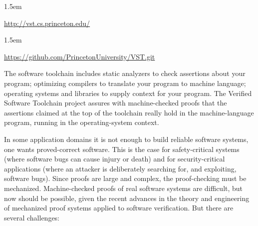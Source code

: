 \documentclass[12pt,twoside]{article}
\begin{document}
\begin{mddefinitions}%


\begin{mdbmarginx}{}{}{}{1.5em}%
\begin{mddefdata}%
\href{http://vst.cs.princeton.edu/}{{\ttfamily http://\hspace{0pt}vst.\hspace{0pt}cs.\hspace{0pt}princeton.\hspace{0pt}edu/\hspace{0pt}}}
\end{mddefdata}%
\end{mdbmarginx}%


\begin{mdbmarginx}{}{}{}{1.5em}%
\begin{mddefdata}%
\href{https://github.com/PrincetonUniversity/VST.git}{{\ttfamily https://\hspace{0pt}github.\hspace{0pt}com/\hspace{0pt}PrincetonUniversity/\hspace{0pt}VST.\hspace{0pt}git}}%
\end{mddefdata}%
\end{mdbmarginx}%
\end{mddefinitions}%

\noindent{}The software toolchain includes static analyzers to check assertions
about your program; optimizing compilers to translate your program to
machine language; operating systems and libraries to supply context
for your program. The Verified Software Toolchain project assures with
machine-checked proofs that the assertions claimed at the top of the
toolchain really hold in the machine-language program, running in the
operating-system context.%

In some application domains it is not enough to build reliable
software systems, one wants proved-correct software. This is the case
for safety-critical systems (where software bugs can cause injury or
death) and for security-critical applications (where an attacker is
deliberately searching for, and exploiting, software bugs). Since
proofs are large and complex, the proof-checking must be
mechanized. Machine-checked proofs of real software systems are
difficult, but now should be possible, given the recent advances in
the theory and engineering of mechanized proof systems applied to
software verification. But there are several challenges:%
\end{document}
